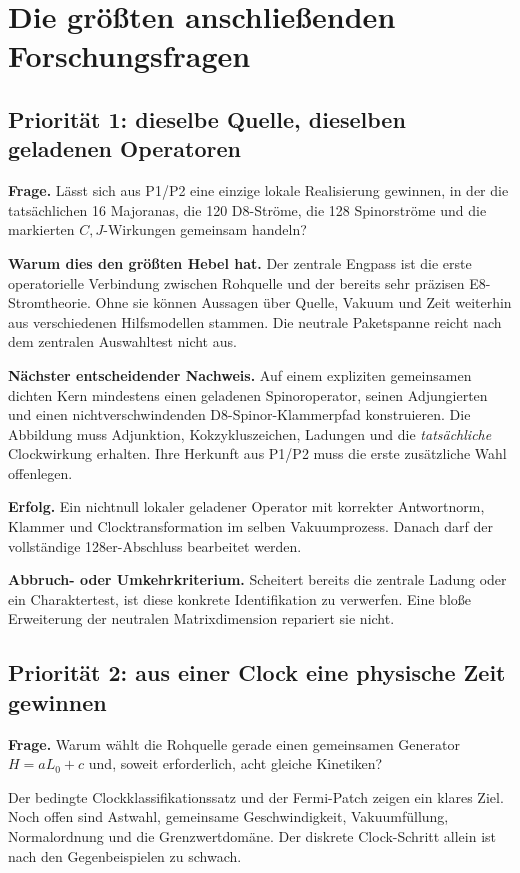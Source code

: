 \documentclass[11pt,a4paper,oneside,parskip=half,headings=normal,numbers=noenddot,bibliography=totoc]{scrreprt}
\begin{document}
\chapter{Die größten anschließenden Forschungsfragen}
\section{Priorität 1: dieselbe Quelle, dieselben geladenen Operatoren}
\textbf{Frage.} Lässt sich aus P1/P2 eine einzige lokale Realisierung gewinnen, in der die tatsächlichen 16 Majoranas, die 120 D8-Ströme, die 128 Spinorströme und die markierten $C,J$-Wirkungen gemeinsam handeln?

\textbf{Warum dies den größten Hebel hat.} Der zentrale Engpass ist die erste operatorielle Verbindung zwischen Rohquelle und der bereits sehr präzisen E8-Stromtheorie. Ohne sie können Aussagen über Quelle, Vakuum und Zeit weiterhin aus verschiedenen Hilfsmodellen stammen. Die neutrale Paketspanne reicht nach dem zentralen Auswahltest nicht aus.

\textbf{Nächster entscheidender Nachweis.} Auf einem expliziten gemeinsamen dichten Kern mindestens einen geladenen Spinoroperator, seinen Adjungierten und einen nichtverschwindenden D8-Spinor-Klammerpfad konstruieren. Die Abbildung muss Adjunktion, Kokzykluszeichen, Ladungen und die \emph{tatsächliche} Clockwirkung erhalten. Ihre Herkunft aus P1/P2 muss die erste zusätzliche Wahl offenlegen.

\textbf{Erfolg.} Ein nichtnull lokaler geladener Operator mit korrekter Antwortnorm, Klammer und Clocktransformation im selben Vakuumprozess. Danach darf der vollständige 128er-Abschluss bearbeitet werden.

\textbf{Abbruch- oder Umkehrkriterium.} Scheitert bereits die zentrale Ladung oder ein Charaktertest, ist diese konkrete Identifikation zu verwerfen. Eine bloße Erweiterung der neutralen Matrixdimension repariert sie nicht.

\section{Priorität 2: aus einer Clock eine physische Zeit gewinnen}
\textbf{Frage.} Warum wählt die Rohquelle gerade einen gemeinsamen Generator $H=aL_0+c$ und, soweit erforderlich, acht gleiche Kinetiken?

Der bedingte Clockklassifikationssatz und der Fermi-Patch zeigen ein klares Ziel. Noch offen sind Astwahl, gemeinsame Geschwindigkeit, Vakuumfüllung, Normalordnung und die Grenzwertdomäne. Der diskrete Clock-Schritt allein ist nach den Gegenbeispielen zu schwach.
\end{document}
